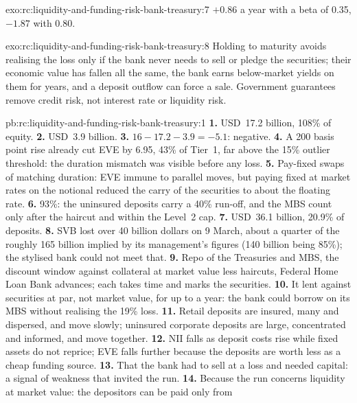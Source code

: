 \begin{solution}{exo:rc:liquidity-and-funding-risk-bank-treasury:7}
$+0.86$ a year with a beta of 0.35, $-1.87$ with 0.80.
\end{solution}

\begin{solution}{exo:rc:liquidity-and-funding-risk-bank-treasury:8}
Holding to maturity avoids realising the loss only if the bank never needs to sell or pledge the
securities; their economic value has fallen all the same, the bank earns below-market yields on them
for years, and a deposit outflow can force a sale. Government guarantees remove credit risk, not
interest rate or liquidity risk.
\end{solution}

\begin{solution}{pb:rc:liquidity-and-funding-risk-bank-treasury:1}
\textbf{1.} USD~17.2 billion, 108\% of equity.
\textbf{2.} USD~3.9 billion.
\textbf{3.} $16-17.2-3.9 = -5.1$: negative.
\textbf{4.} A 200 basis point rise already cut EVE by 6.95, 43\% of Tier~1, far above the 15\% outlier
threshold: the duration mismatch was visible before any loss.
\textbf{5.} Pay-fixed swaps of matching duration: EVE immune to parallel moves, but paying fixed at
market rates on the notional reduced the carry of the securities to about the floating rate.
\textbf{6.} 93\%: the uninsured deposits carry a 40\% run-off, and the MBS count only after the haircut
and within the Level~2 cap.
\textbf{7.} USD~36.1 billion, 20.9\% of deposits.
\textbf{8.} SVB lost over 40 billion dollars on 9 March, about a quarter of the roughly 165 billion
implied by its management's figures (140 billion being 85\%); the stylised bank could not meet that.
\textbf{9.} Repo of the Treasuries and MBS, the discount window against collateral at market value less
haircuts, Federal Home Loan Bank advances; each takes time and marks the securities.
\textbf{10.} It lent against securities at par, not market value, for up to a year: the bank could borrow
on its MBS without realising the 19\% loss.
\textbf{11.} Retail deposits are insured, many and dispersed, and move slowly; uninsured corporate deposits
are large, concentrated and informed, and move together.
\textbf{12.} NII falls as deposit costs rise while fixed assets do not reprice; EVE falls further because
the deposits are worth less as a cheap funding source.
\textbf{13.} That the bank had to sell at a loss and needed capital: a signal of weakness that invited
the run.
\textbf{14.} Because the run concerns liquidity at market value: the depositors can be paid only from

\end{solution}
